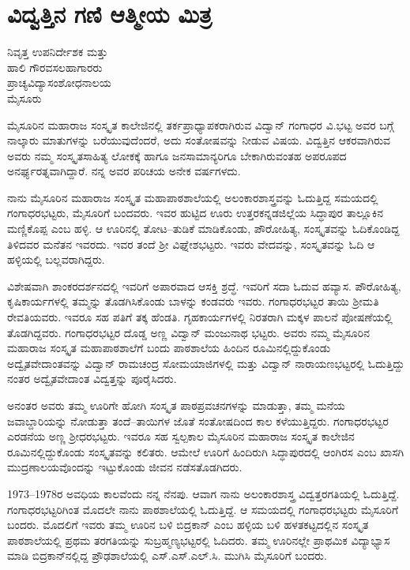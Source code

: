 {\fontsize{14}{16}\selectfont
\chapter{ವಿದ್ವತ್ತಿನ ಗಣಿ ಆತ್ಮೀಯ ಮಿತ್ರ}

\begin{center}
\smallskip
ನಿವೃತ್ತ ಉಪನಿರ್ದೇಶಕ ಮತ್ತು\\ 
ಹಾಲಿ ಗೌರವಸಲಹಾಗಾರರು\\
ಪ್ರಾಚ್ಯವಿದ್ಯಾಸಂಶೋಧನಾಲಯ\\
ಮೈಸೂರು
\addrule
\end{center}

ಮೈಸೂರಿನ ಮಹಾರಾಜ ಸಂಸ್ಕೃತ ಕಾಲೇಜಿನಲ್ಲಿ ತರ್ಕಪ್ರಾಧ್ಯಾಪಕರಾಗಿರುವ ವಿದ್ವಾನ್ ಗಂಗಾಧರ ವಿ.ಭಟ್ಟ ಅವರ ಬಗ್ಗೆ ನಾಲ್ಕಾರು ಮಾತುಗಳನ್ನು ಬರೆಯುವುದೆಂದರೆ, ಅದು ಸಂತೋಷವನ್ನು ನೀಡುವ ವಿಷಯ. ವಿದ್ವತ್ತಿನ ಆಕರವಾಗಿರುವ ಅವರು ನಮ್ಮ ಸಂಸ್ಕೃತಸಾಹಿತ್ಯ ಲೋಕಕ್ಕೆ ಹಾಗೂ ಜನಸಾಮಾನ್ಯರಿಗೂ ಬೇಕಾಗಿರುವಂತಹ ಅಪರೂಪದ ಅನರ್ಘ್ಯರತ್ನವಾಗಿದ್ದಾರೆ. ನನ್ನ ಅವರ ಪರಿಚಯ ಅನೇಕ ವರ್ಷಗಳದು. 

ನಾನು ಮೈಸೂರಿನ ಮಹಾರಾಜ ಸಂಸ್ಕೃತ ಮಹಾಪಾಠಶಾಲೆಯಲ್ಲಿ ಅಲಂಕಾರಶಾಸ್ತ್ರವನ್ನು ಓದುತ್ತಿದ್ದ ಸಮಯದಲ್ಲಿ ಗಂಗಾಧರಭಟ್ಟರು, ಮೈಸೂರಿಗೆ ಬಂದವರು. ಇವರ ಹುಟ್ಟಿದ ಊರು ಉತ್ತರಕನ್ನಡಜಿಲ್ಲೆಯ ಸಿದ್ಧಾಪುರ ತಾಲ್ಲೂಕಿನ ಮಣ್ಣಿಕೊಪ್ಪ ಎಂಬ ಹಳ್ಳಿ. ಆ ಊರಿನಲ್ಲಿ ತೋಟ–ತುಡಿಕೆ ಮಾಡಿಕೊಂಡು, ಪೌರೋಹಿತ್ಯ, ಸಂಸ್ಕೃತವನ್ನು ಓದಿಕೊಂಡಿದ್ದ ತಿಳಿದವರ ಮನೆತನ ಇವರದು. ಇವರ ತಂದೆ ಶ್ರೀ ವಿಘ್ನೇಶಭಟ್ಟರು. ಇವರು ವೇದವನ್ನು, ಸಂಸ್ಕೃತವನ್ನು ಓದಿ ಆ ಹಳ್ಳಿಯಲ್ಲಿ ಬಲ್ಲವರಾಗಿದ್ದರು.

ವಿಶೇಷವಾಗಿ ಶಾಂಕರದರ್ಶನದಲ್ಲಿ ಇವರಿಗೆ ಅಪಾರವಾದ ಆಸಕ್ತಿ ಶ್ರದ್ಧೆ. ಇವರಿಗೆ ಸದಾ ಓದುವ ಹವ್ಯಾಸ. ಪೌರೋಹಿತ್ಯ, ಕೃಷಿಕಾರ್ಯಗಳಲ್ಲಿ ತಮ್ಮನ್ನು ತೊಡಗಿಸಿಕೊಂಡು ಬಾಳನ್ನು ಕಂಡವರು ಇವರು. ಗಂಗಾಧರಭಟ್ಟರ ತಾಯಿ ಶ್ರೀಮತಿ ರೇವತಿಯವರು. ಇವರೂ ಸಹ ಪತಿಗೆ ತಕ್ಕ ಹೆಂಡತಿ. ಗೃಹಕಾರ್ಯಗಳಲ್ಲಿ ನಿರತರಾಗಿ ಮಕ್ಕಳ ಪಾಲನೆ ಪೋಷಣೆಯಲ್ಲಿ ತೊಡಗಿದ್ದವರು. ಗಂಗಾಧರಭಟ್ಟರ ದೊಡ್ಡ ಅಣ್ಣ ವಿದ್ವಾನ್ ಮಂಜುನಾಥ ಭಟ್ಟರು. ಅವರು ನಮ್ಮ ಮೈಸೂರಿನ ಮಹಾರಾಜ ಸಂಸ್ಕೃತ ಮಹಾಪಾಠಶಾಲೆಗೆ ಬಂದು ಪಾಠಶಾಲೆಯ ಹಿಂದಿನ ರೂಮಿನಲ್ಲಿದ್ದುಕೊಂಡು ಅದ್ವೈತವೇದಾಂತವನ್ನು ವಿದ್ವಾನ್ ರಾಮಚಂದ್ರ ಸೋಮಯಾಜಿಗಳಲ್ಲಿ ಮತ್ತು ವಿದ್ವಾನ್ ನಾರಾಯಣಭಟ್ಟರಲ್ಲಿ ಓದುತ್ತಿದ್ದು ನಂತರ ಅದ್ವೈತವೇದಾಂತ ವಿದ್ವತ್ತನ್ನು ಪೂರೈಸಿದರು. 

ಅನಂತರ ಅವರು ತಮ್ಮ ಊರಿಗೇ ಹೋಗಿ ಸಂಸ್ಕೃತ ಪಾಠಪ್ರವಚನಗಳನ್ನು ಮಾಡುತ್ತಾ, ತಮ್ಮ ಮನೆಯ ಜವಾಬ್ದಾರಿಯನ್ನು ನೋಡುತ್ತಾ ತಂದೆ–ತಾಯಿಗಳ ಜೊತೆ ಸಂತೋಷದಿಂದ ಕಾಲ ಕಳೆಯುತ್ತಿದ್ದರು. ಗಂಗಾಧರಭಟ್ಟರ ಎರಡನೆಯ ಅಣ್ಣ ಶ್ರೀಧರಭಟ್ಟರು. ಇವರೂ ಸಹ ಸ್ವಲ್ಪಕಾಲ ಮೈಸೂರಿನ ಮಹಾರಾಜ ಸಂಸ್ಕೃತ ಕಾಲೇಜಿನ ರೂಮಿನಲ್ಲಿದ್ದುಕೊಂಡು ಸಂಸ್ಕೃತವನ್ನು ಕಲಿತರು. ಆಮೇಲೆ ಊರಿಗೆ ಹಿಂದಿರುಗಿ ಸಿದ್ಧಾಪುರದಲ್ಲಿ ಆಂಗಿರಸ ಎಂಬ ಖಾಸಗಿ ಮುದ್ರಣಾಲಯವೊಂದನ್ನು ಇಟ್ಟುಕೊಂಡು ಜೀವನ ನಡೆಸತೊಡಗಿದರು.

1973–1978ರ ಅವಧಿಯ ಕಾಲವೆಂದು ನನ್ನ ನೆನಪು. ಆವಾಗ ನಾನು ಅಲಂಕಾರಶಾಸ್ತ್ರ ವಿದ್ವತ್ತರಗತಿಯಲ್ಲಿ ಓದುತ್ತಿದ್ದೆ. ಗಂಗಾಧರಭಟ್ಟರಿಗಿಂತ ಮೊದಲೇ ನಾನು ಪಾಠಶಾಲೆಯಲ್ಲಿ ಓದುತ್ತಿದ್ದೆ. ಆ ಸಮಯದಲ್ಲಿ ಗಂಗಾಧರಭಟ್ಟರು ಮೈಸೂರಿಗೆ ಬಂದರು. ಮೊದಲಿಗೆ ಇವರು ತಮ್ಮ ಊರಿನ ಬಳಿ ಬಿದ್ರಕಾನ್ ಎಂಬ ಹಳ್ಳಿಯ ಬಳಿ ಹಳತಕಟ್ಟದಲ್ಲಿನ ಸಂಸ್ಕೃತ ಪಾಠಶಾಲೆಯಲ್ಲಿ ಪ್ರಥಮ ತರಗತಿಯನ್ನು ಸುಬ್ರಹ್ಮಣ್ಯಭಟ್ಟರಲ್ಲಿ ಓದಿದರು. ತಮ್ಮ ಊರಿನಲ್ಲೇ ಪ್ರಾಥಮಿಕ ವಿದ್ಯಾಭ್ಯಾಸ ಮಾಡಿ ಬಿದ್ರಕಾನ್‍ನಲ್ಲಿದ್ದ ಪ್ರೌಢಶಾಲೆಯಲ್ಲಿ ಎಸ್.ಎಸ್.ಎಲ್.ಸಿ. ಮುಗಿಸಿ ಮೈಸೂರಿಗೆ ಬಂದರು.

}
